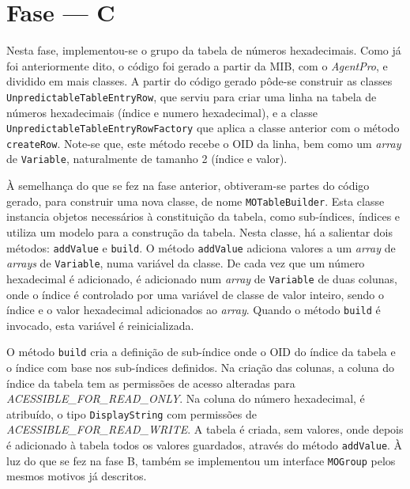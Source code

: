\section{Fase --- C}
Nesta fase, implementou-se o grupo da tabela de números hexadecimais.  Como já
foi anteriormente dito, o código foi gerado a partir da MIB, com
o \emph{AgentPro}, e dividido em mais classes. A partir do código gerado pôde-se
construir as classes \texttt{UnpredictableTableEntryRow}, que serviu para criar
uma linha na tabela de números hexadecimais (índice e numero hexadecimal), 
e a classe \texttt{UnpredictableTableEntryRowFactory} que aplica a classe
anterior com o método \texttt{createRow}. Note-se que, este método recebe o OID
da linha, bem como um \emph{array} de \texttt{Variable}, naturalmente de tamanho
2 (índice e valor).

À semelhança do que se fez na fase anterior, obtiveram-se partes do código
gerado, para construir uma nova classe, de nome \texttt{MOTableBuilder}. Esta
classe instancia objetos necessários à constituição da tabela, como sub-índices,
índices e utiliza um modelo para a construção da tabela. Nesta classe, há
a salientar dois métodos: \texttt{addValue} e \texttt{build}. O método
\texttt{addValue} adiciona valores a um \emph{array} de \emph{arrays} de
\texttt{Variable}, numa variável da classe. De cada vez que um número
hexadecimal é adicionado, é adicionado num \emph{array} de \texttt{Variable} de
duas colunas, onde o índice é controlado por uma variável de classe de valor
inteiro, sendo o índice e o valor hexadecimal adicionados ao \emph{array}.
Quando o método \texttt{build} é invocado, esta variável é reinicializada.

O método \texttt{build} cria a definição de sub-índice onde o OID do índice da
tabela e o índice com base nos sub-índices definidos.  Na criação das colunas,
a coluna do índice da tabela tem as permissões de acesso alteradas para
\emph{ACESSIBLE\_FOR\_READ\_ONLY}. Na coluna do número hexadecimal, é atribuído,
o tipo \texttt{DisplayString} com permissões de
\emph{ACESSIBLE\_FOR\_READ\_WRITE}.  A tabela é criada, sem valores, onde depois
é adicionado à tabela todos os valores guardados, através do método
\texttt{addValue}.  À luz do que se fez na fase B, também se implementou um
interface \texttt{MOGroup} pelos mesmos motivos já descritos.

